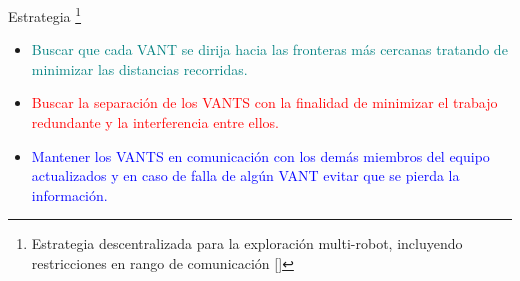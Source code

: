\documentclass[
  24pt, %
  aspectratio=169, %
]{beamer}
\begin{document}
\begin{frame}{Estrategia \footnote{Estrategia descentralizada para la exploración multi-robot, incluyendo restricciones en rango de comunicación [\cite{LEAL2013}]}}

  
  
  \begin{minipage}{0.67\textwidth}
    \begin{itemize}
    \item[] \textcolor{teal}{Buscar que cada VANT se dirija hacia las fronteras más cercanas tratando de minimizar las distancias recorridas.}
      \bigskip %
    \item[] \textcolor{red}{Buscar la separación de los VANTS con la finalidad de minimizar el trabajo redundante y la interferencia entre ellos.}
      \bigskip %
    \item[] \textcolor{blue}{Mantener los VANTS en comunicación con los demás miembros del equipo actualizados y en caso de falla de algún VANT evitar que se pierda la información.}
    \end{itemize}
  \end{minipage}
  \hspace{0.6cm}
  \begin{minipage}{0.2\textwidth}

\end{minipage}
\end{frame}
\end{document}
